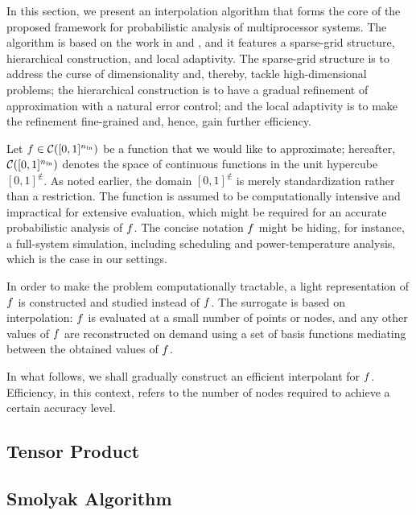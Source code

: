 In this section, we present an interpolation algorithm that forms the core of
the proposed framework for probabilistic analysis of multiprocessor systems. The
algorithm is based on the work in \cite{klimke2006} and \cite{ma2009}, and it
features a sparse-grid structure, hierarchical construction, and local
adaptivity. The sparse-grid structure is to address the curse of dimensionality
and, thereby, tackle high-dimensional problems; the hierarchical construction is
to have a gradual refinement of approximation with a natural error control; and
the local adaptivity is to make the refinement fine-grained and, hence, gain
further efficiency.

Let $f \in \mathcal{C}([0, 1]^{n_\text{in}})$ be a function that we would like to
approximate; hereafter, $\mathcal{C}([0, 1]^{n_\text{in}})$ denotes the space of
continuous functions in the unit hypercube $[0, 1]^\nin$. As noted earlier, the
domain $[0, 1]^\nin$ is merely standardization rather than a restriction. The
function is assumed to be computationally intensive and impractical for
extensive evaluation, which might be required for an accurate probabilistic
analysis of $f$. The concise notation $f$ might be hiding, for instance, a
full-system simulation, including scheduling and power-temperature analysis,
which is the case in our settings.

In order to make the problem computationally tractable, a light representation
of $f$ is constructed and studied instead of $f$. The surrogate is based on
interpolation: $f$ is evaluated at a small number of points or nodes, and any
other values of $f$ are reconstructed on demand using a set of basis functions
mediating between the obtained values of $f$.

In what follows, we shall gradually construct an efficient interpolant for $f$.
Efficiency, in this context, refers to the number of nodes required to achieve a
certain accuracy level.

\subsection{Tensor Product} 


\subsection{Smolyak Algorithm} 



